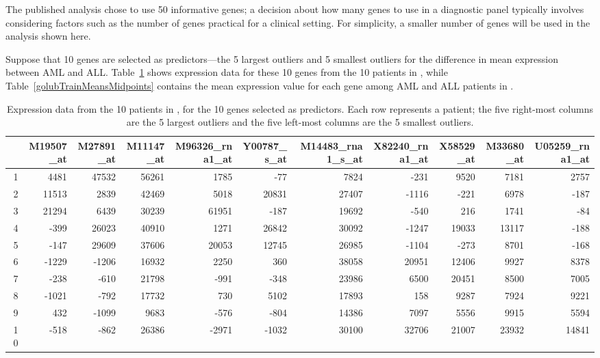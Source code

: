 The published analysis chose to use 50 informative genes; a decision about how many genes to use in a diagnostic panel typically involves considering factors such as the number of genes practical for a clinical setting. For simplicity, a smaller number of genes will be used in the analysis shown here. 

Suppose that 10 genes are selected as predictors---the 5 largest outliers and 5 smallest outliers for the difference in mean expression between AML and ALL. Table~\ref{golubTestData} shows expression data for these 10 genes from the 10 patients in , while Table~\ref{golubTrainMeansMidpoints} contains the mean expression value for each gene among AML and ALL patients in .

\begin{table}[ht]
	\tiny
	\centering
	\begin{tabular}{r|rrrrr|rrrrr}
		\hline
		& M19507\_at & M27891\_at & M11147\_at & M96326\_rna1\_at & Y00787\_s\_at & M14483\_rna1\_s\_at & X82240\_rna1\_at & X58529\_at & M33680\_at & U05259\_rna1\_at \\ 
		\hline
		1 & 4481 & 47532 & 56261 & 1785 & -77 & 7824 & -231 & 9520 & 7181 & 2757 \\ 
		2 & 11513 & 2839 & 42469 & 5018 & 20831 & 27407 & -1116 & -221 & 6978 & -187 \\ 
		3 & 21294 & 6439 & 30239 & 61951 & -187 & 19692 & -540 & 216 & 1741 & -84 \\ 
		4 & -399 & 26023 & 40910 & 1271 & 26842 & 30092 & -1247 & 19033 & 13117 & -188 \\ 
		5 & -147 & 29609 & 37606 & 20053 & 12745 & 26985 & -1104 & -273 & 8701 & -168 \\ 
		6 & -1229 & -1206 & 16932 & 2250 & 360 & 38058 & 20951 & 12406 & 9927 & 8378 \\ 
		7 & -238 & -610 & 21798 & -991 & -348 & 23986 & 6500 & 20451 & 8500 & 7005 \\ 
		8 & -1021 & -792 & 17732 & 730 & 5102 & 17893 & 158 & 9287 & 7924 & 9221 \\ 
		9 & 432 & -1099 & 9683 & -576 & -804 & 14386 & 7097 & 5556 & 9915 & 5594 \\ 
		10 & -518 & -862 & 26386 & -2971 & -1032 & 30100 & 32706 & 21007 & 23932 & 14841 \\ 
		\hline
	\end{tabular}
	\caption{Expression data from the 10 patients in , for the 10 genes selected as predictors. Each row represents a patient; the five right-most columns are the 5 largest outliers and the five left-most columns are the 5 smallest outliers.}
	\label{golubTestData}
\end{table}


